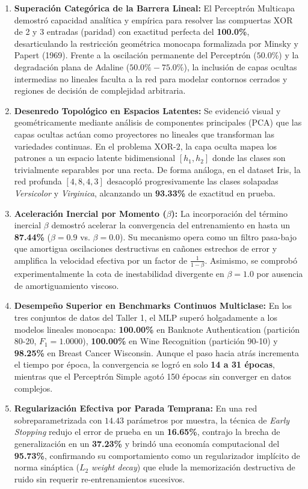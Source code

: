 \documentclass[11pt,letterpaper]{article}
\begin{document}
\begin{enumerate}
    \item \textbf{Superación Categórica de la Barrera Lineal:} El Perceptrón Multicapa demostró capacidad analítica y empírica para resolver las compuertas $\text{XOR}$ de 2 y 3 entradas (paridad) con exactitud perfecta del \textbf{100.0\%}, desarticulando la restricción geométrica monocapa formalizada por Minsky y Papert (1969). Frente a la oscilación permanente del Perceptrón ($50.0\%$) y la degradación plana de Adaline ($50.0\%-75.0\%$), la inclusión de capas ocultas intermedias no lineales faculta a la red para modelar contornos cerrados y regiones de decisión de complejidad arbitraria.
    \item \textbf{Desenredo Topológico en Espacios Latentes:} Se evidenció visual y geométricamente mediante análisis de componentes principales (PCA) que las capas ocultas actúan como proyectores no lineales que transforman las variedades continuas. En el problema $\text{XOR-2}$, la capa oculta mapea los patrones a un espacio latente bidimensional $[h_1, h_2]$ donde las clases son trivialmente separables por una recta. De forma análoga, en el dataset Iris, la red profunda $[4, 8, 4, 3]$ desacopló progresivamente las clases solapadas \textit{Versicolor} y \textit{Virginica}, alcanzando un \textbf{93.33\%} de exactitud en prueba.
    \item \textbf{Aceleración Inercial por Momento ($\beta$):} La incorporación del término inercial $\beta$ demostró acelerar la convergencia del entrenamiento en hasta un \textbf{87.44\%} ($\beta = 0.9$ vs. $\beta = 0.0$). Su mecanismo opera como un filtro pasa-bajo que amortigua oscilaciones destructivas en cañones estrechos de error y amplifica la velocidad efectiva por un factor de $\frac{1}{1-\beta}$. Asimismo, se comprobó experimentalmente la cota de inestabilidad divergente en $\beta = 1.0$ por ausencia de amortiguamiento viscoso.
    \item \textbf{Desempeño Superior en Benchmarks Continuos Multiclase:} En los tres conjuntos de datos del Taller 1, el MLP superó holgadamente a los modelos lineales monocapa: \textbf{100.00\%} en Banknote Authentication (partición 80-20, $F_1 = 1.0000$), \textbf{100.00\%} en Wine Recognition (partición 90-10) y \textbf{98.25\%} en Breast Cancer Wisconsin. Aunque el paso hacia atrás incrementa el tiempo por época, la convergencia se logró en solo \textbf{14 a 31 épocas}, mientras que el Perceptrón Simple agotó 150 épocas sin converger en datos complejos.
    \item \textbf{Regularización Efectiva por Parada Temprana:} En una red sobreparametrizada con $14.43$ parámetros por muestra, la técnica de \textit{Early Stopping} redujo el error de prueba en un \textbf{16.65\%}, contrajo la brecha de generalización en un \textbf{37.23\%} y brindó una economía computacional del \textbf{95.73\%}, confirmando su comportamiento como un regularizador implícito de norma sináptica ($L_2$ \textit{weight decay}) que elude la memorización destructiva de ruido sin requerir re-entrenamientos sucesivos.

\end{enumerate}
\end{document}
